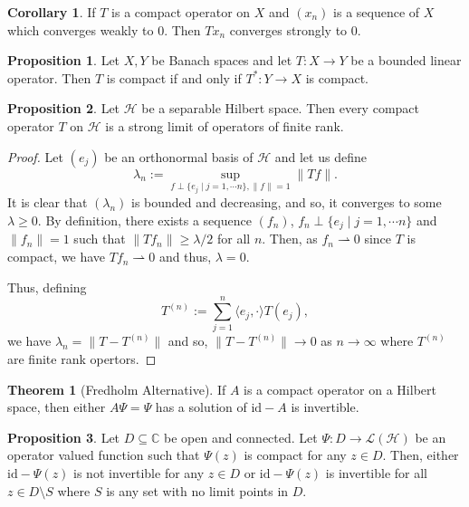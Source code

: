 \documentclass[]{article}
\theoremstyle{definition}
\newtheorem{theorem}{Theorem}
\theoremstyle{definition}
\newtheorem{proposition}{Proposition}[section]
\newtheorem{corollary}{Corollary}[section]
\newcommand{\weak}{\rightharpoonup}
\begin{document}
\begin{corollary}
  If \(T\) is a compact operator on \(X\) and \((x_n)\) is a sequence of 
  \(X\) which converges weakly to 0. Then \(T x_n\) converges strongly to 0.
\end{corollary}

\begin{proposition}
  Let \(X, Y\) be Banach spaces and let \(T : X \to Y\) be a bounded linear 
  operator. Then \(T\) is compact if and only if \(T^* : Y \to X\) is compact.
\end{proposition}

\begin{proposition}
  Let \(\mathcal{H}\) be a separable Hilbert space. Then every compact operator
  \(T\) on \(\mathcal{H}\) is a strong limit of operators of finite rank.
\end{proposition}
\begin{proof}
  Let \((e_j)\) be an orthonormal basis of \(\mathcal{H}\) and let us define 
  \[\lambda_n := \sup_{f \perp \{e_j \mid j = 1, \cdots n\}, \|f\| = 1} \|Tf\|.\]
  It is clear that \((\lambda_n)\) is bounded and decreasing, and so, it converges 
  to some \(\lambda \ge 0\). By definition, there exists a sequence \((f_n)\), 
  \(f_n \perp \{e_j \mid j = 1, \cdots n\}\) and \(\|f_n\| = 1\) such that 
  \(\|Tf_n\| \ge \lambda / 2\) for all \(n\). Then, as \(f_n \weak 0\) since 
  \(T\) is compact, we have \(Tf_n \weak 0\) and thus, \(\lambda = 0\).

  Thus, defining 
  \[T^{(n)} := \sum_{j = 1}^n \langle e_j, \cdot \rangle T(e_j),\]
  we have \(\lambda_n = \|T - T^{(n)}\|\) and so, \(\|T - T^{(n)}\| \to 0\) 
  as \(n \to \infty\) where \(T^{(n)}\) are finite rank opertors.
\end{proof}

\begin{theorem}[Fredholm Alternative]
  If \(A\) is a compact operator on a Hilbert space, then either \(A\Psi = \Psi\) 
  has a solution of \(\text{id} - A\) is invertible.
\end{theorem}

\begin{proposition}
  Let \(D \subseteq \mathbb{C}\) be open and connected. Let \(\Psi : D \to 
  \mathcal{L}(\mathcal{H})\) be an operator valued function such that 
  \(\Psi(z)\) is compact for any \(z \in D\). Then, either 
  \(\text{id} - \Psi(z)\) is not invertible for any \(z \in D\) or 
  \(\text{id} - \Psi(z)\) is invertible for all \(z \in D \setminus S\) where 
  \(S\) is any set with no limit points in \(D\).
\end{proposition}
\end{document}
